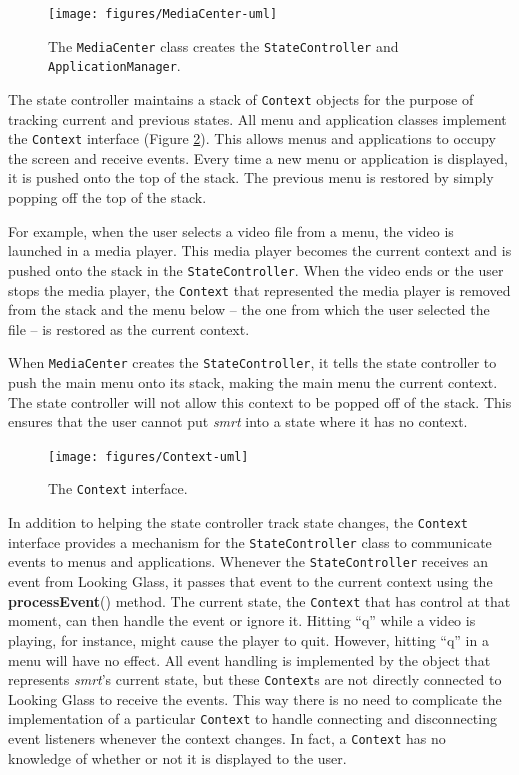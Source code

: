 \documentclass[letterpaper, titlepage, 11pt]{article}
\begin{document}
\begin{figure}[htb]
\centering
\texttt{[image: figures/MediaCenter-uml]}
\caption{The \texttt{MediaCenter} class creates the \texttt{StateController}
and \texttt{ApplicationManager}.\label{fig:MediaCenter}}
\end{figure}

The state controller maintains a stack of \texttt{Context} objects for the
purpose of tracking current and previous states. All menu and application
classes implement the \texttt{Context} interface (Figure \ref{fig:Context}).
This allows menus and applications to occupy the screen and receive events.
Every time a new menu or application is displayed, it is pushed onto the top
of the stack.  The previous menu is restored by simply popping off the top
of the stack.

For example, when the user selects a video file from a menu, the video is
launched in a media player.  This media player becomes the current context and
is pushed onto the stack in the \texttt{StateController}.  When the video ends
or the user stops the media player, the \texttt{Context} that represented the
media player is removed from the stack and the menu below -- the one from which
the user selected the file -- is restored as the current context.

When \texttt{MediaCenter} creates the \texttt{StateController}, it tells the
state controller to push the main menu onto its stack, making the main menu the
current context. The state controller will not allow this context to be popped
off of the stack. This ensures that the user cannot put \textit{smrt} into a
state where it has no context.

\begin{figure}[htb]
\centering
\texttt{[image: figures/Context-uml]}
\caption{The \texttt{Context} interface.\label{fig:Context}}
\end{figure}

In addition to helping the state controller track state changes, the
\texttt{Context} interface provides a mechanism for the
\texttt{StateController} class to communicate events to menus and applications.
Whenever the \texttt{StateController} receives an event from Looking Glass, it
passes that event to the current context using the \textbf{processEvent}()
method. The current state, the \texttt{Context} that has control at that
moment, can then handle the event or ignore it. Hitting ``q'' while a video is
playing, for instance, might cause the player to quit. However, hitting ``q''
in a menu will have no effect. All event handling is implemented by the object
that represents \textit{smrt}'s current state, but these \texttt{Context}s are
not directly connected to Looking Glass to receive the events. This way there
is no need to complicate the implementation of a particular \texttt{Context}
to handle connecting and disconnecting event listeners whenever the context
changes.  In fact, a \texttt{Context} has no knowledge of whether or not it is
displayed to the user.
\end{document}
